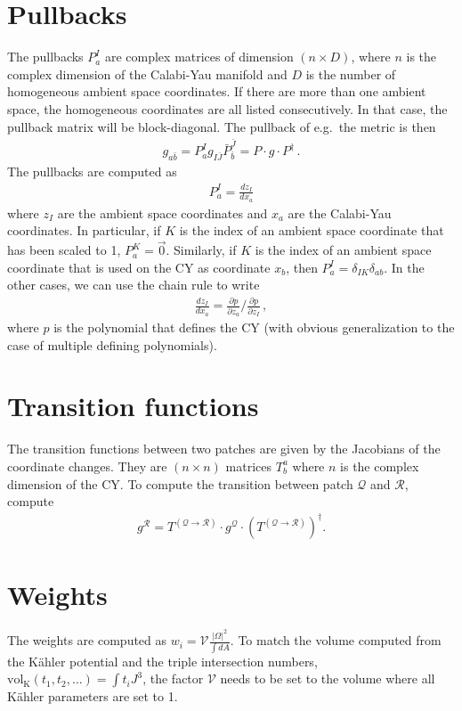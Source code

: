 \documentclass[11pt]{article}
\newcommand{\volk}{\ensuremath{\text{vol}_\text{K}}\xspace}
\newcommand{\volnorm}{\ensuremath{\mathcal{V}}\xspace}
\begin{document}
\section{Pullbacks}
The pullbacks $P_a^I$ are complex matrices of dimension $(n \times D)$, where $n$ is the complex dimension of the Calabi-Yau manifold and $D$ is the number of homogeneous ambient space coordinates. If there are more than one ambient space, the homogeneous coordinates are all listed consecutively. In that case, the pullback matrix will be block-diagonal. The pullback of e.g.\ the metric is then 
\begin{align*}
g_{a\bar b}=P_a^I g_{I\bar J}\bar{P}_{\bar b}^{\bar J}=P\cdot g\cdot P^\dagger\,.
\end{align*}
\noindent
The pullbacks are computed as
\begin{align*}
P_a^I = \frac{dz_I}{dx_a}
\end{align*}
where $z_I$ are the ambient space coordinates and $x_a$ are the Calabi-Yau coordinates. In particular, if $K$ is the index of an ambient space coordinate that has been scaled to 1, $P_a^K=\vec{0}$. Similarly, if $K$ is the index of an ambient space coordinate that is used on the CY as coordinate $x_b$, then $P_a^I=\delta_{IK}\delta_{ab}$. In the other cases, we can use the chain rule to write 
\begin{align*}
\frac{dz_I}{dx_a}=\frac{\partial p}{\partial z_a}/\frac{\partial p}{\partial z_I}\,, 
\end{align*}
where $p$ is the polynomial that defines the CY (with obvious generalization to the case of multiple defining polynomials).

\section{Transition functions}
The transition functions between two patches are given by the Jacobians of the coordinate changes. They are $(n\times n)$ matrices $T^a_b$ where $n$ is the complex dimension of the CY. To compute the transition between patch $\mathcal{Q}$ and $\mathcal{R}$, compute 
\begin{align*}
g^{\mathcal{R}} = T^{(\mathcal{Q}\to\mathcal{R})} \cdot g^{\mathcal{Q}} \cdot (T^{(\mathcal{Q}\to\mathcal{R})})^\dagger.
\end{align*}

\section{Weights}
The weights are computed as $w_i=\volnorm\frac{|\Omega|^2}{\int dA}$. To match the volume computed from the K\"ahler potential and the triple intersection numbers, $\volk(t_1, t_2,\ldots)=\int t_i J^3$, the factor $\volnorm$ needs to be set to the volume where all K\"ahler parameters are set to 1. 
\medskip
\end{document}

